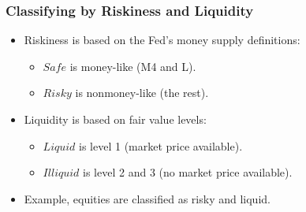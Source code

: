 \documentclass[handout]{beamer}
\begin{document}
\begin{frame}[label=classify]
\frametitle{Classifying by Riskiness and Liquidity}
\begin{itemize}
\item Riskiness is based on the Fed's money supply definitions:
\begin{itemize}
\item $Safe$ is money-like (M4 and L). 
\item $Risky$ is nonmoney-like (the rest).
\end{itemize}
\item Liquidity is based on fair value levels:
\begin{itemize}
\item $Liquid$ is level 1 (market price available).
\item $Illiquid$ is level 2 and 3 (no market price available).
\end{itemize}
\bigskip
\item Example, equities are classified as risky and liquid.
\end{itemize}
\end{frame}
\end{document}
